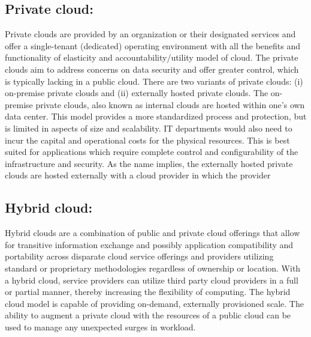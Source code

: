 \documentclass[11pt,a4paper]{report}
\begin{document}
 \subsection{Private cloud:}
 Private clouds are provided by an organization or their designated services and offer a
single-tenant (dedicated) operating environment with all the benefits and functionality of elasticity and
accountability/utility model of cloud. The private clouds aim to address concerns on data security and
offer greater control, which is typically lacking in a public cloud. There are two variants of private clouds:
(i) on-premise private clouds and (ii) externally hosted private clouds. The on-premise private clouds, also
known as internal clouds are hosted within one’s own data center. This model provides a more
standardized process and protection, but is limited in aspects of size and scalability. IT departments would
also need to incur the capital and operational costs for the physical resources. This is best suited for
applications which require complete control and configurability of the infrastructure and security. As the
name implies, the externally hosted private clouds are hosted externally with a cloud provider in which
the provider
 \subsection{Hybrid cloud:}
 Hybrid clouds are a combination of public and private cloud offerings that allow for
transitive information exchange and possibly application compatibility and portability across disparate
cloud service offerings and providers utilizing standard or proprietary methodologies regardless of
ownership or location. With a hybrid cloud, service providers can utilize third party cloud providers in a
full or partial manner, thereby increasing the flexibility of computing. The hybrid cloud model is capable
of providing on-demand, externally provisioned scale. The ability to augment a private cloud with the
resources of a public cloud can be used to manage any unexpected surges in workload.
\end{document}
